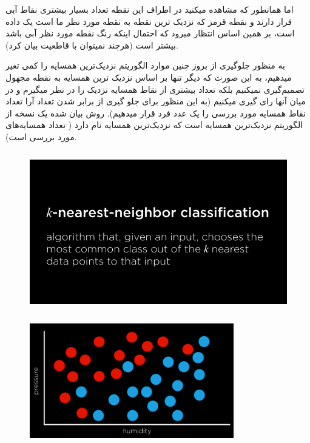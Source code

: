 \documentclass[a4paper, titlepage]{article}
\begin{document}
اما همانطور که مشاهده میکنید در اطراف این نقطه تعداد بسیار بیشتری نقاط آبی قرار دارند و نقطه قرمز که نزدیک ترین نقطه به نقطه مورد نظر ما است یک داده  است، بر همین اساس انتظار میرود که احتمال اینکه رنگ نقطه مورد نظر آبی باشد بیشتر است (هرچند نمیتوان با قاطعیت بیان کرد).

به منظور جلوگیری از بروز چنین موارد الگوریتم نزدیک‌ترین همسایه را کمی تغیر میدهیم، به این صورت که دیگر تنها بر اساس نزدیک ترین همسایه به نقطه مجهول تصمیم‌گیری نمیکنیم بلکه تعداد بیشتری از نقاط همسایه نزدیک را در نظر میگیرم و در میان آنها رای گیری میکنیم (به این منظور برای جلو گیری از برابر شدن تعداد آرا تعداد نقاط همسایه مورد بررسی را یک عدد فرد قرار میدهیم). روش بیان شده یک نسخه از الگوریتم نزدیک‌ترین همسایه است که  نزدیک‌ترین همسایه نام دارد ( تعداد همسایه‌های مورد بررسی است).

\begin{figure}[H]
    \center
    \includegraphics[height=7cm]{Classification-img15.png}
    \label{Classification-img15}
    \caption{}
\end{figure}

\begin{figure}[H]
    \center
    \includegraphics[height=5cm]{Classification-img16.png}
    \label{Classification-img16}
    \caption{}
\end{figure}
\end{document}
